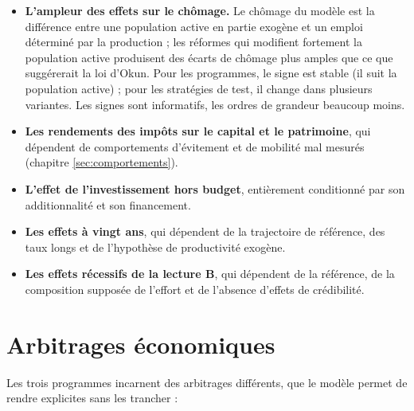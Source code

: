 \documentclass[
  11pt,
  11pt,
  a4paper,
  openany]{book}
\providecommand{\tightlist}{%
  \setlength{\itemsep}{0pt}\setlength{\parskip}{0pt}}
\begin{document}
\begin{itemize}
\tightlist
\item
  \textbf{L'ampleur des effets sur le chômage.} Le chômage du modèle est
  la différence entre une population active en partie exogène et un
  emploi déterminé par la production ; les réformes qui modifient
  fortement la population active produisent des écarts de chômage plus
  amples que ce que suggérerait la loi d'Okun. Pour les programmes, le
  signe est stable (il suit la population active) ; pour les stratégies
  de test, il change dans plusieurs variantes. Les signes sont
  informatifs, les ordres de grandeur beaucoup moins.
\item
  \textbf{Les rendements des impôts sur le capital et le patrimoine},
  qui dépendent de comportements d'évitement et de mobilité mal mesurés
  (chapitre \ref{sec:comportements}).
\item
  \textbf{L'effet de l'investissement hors budget}, entièrement
  conditionné par son additionnalité et son financement.
\item
  \textbf{Les effets à vingt ans}, qui dépendent de la trajectoire de
  référence, des taux longs et de l'hypothèse de productivité exogène.
\item
  \textbf{Les effets récessifs de la lecture B}, qui dépendent de la
  référence, de la composition supposée de l'effort et de l'absence
  d'effets de crédibilité.
\end{itemize}

\hypertarget{sec:arbitrages}{%
\section{Arbitrages économiques}\label{sec:arbitrages}}

Les trois programmes incarnent des arbitrages différents, que le modèle
permet de rendre explicites sans les trancher :
\end{document}
